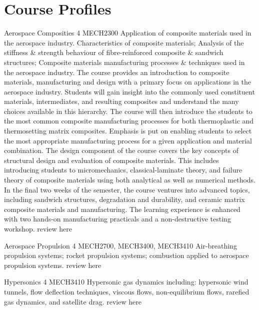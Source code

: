 \chapter{Course Profiles}



	{Aerospace Composities}
	{4}
	{MECH2300}
	{}
	{}
	{Application of composite materials used in the aerospace industry. Characteristics of composite materials; Analysis of the stiffness & strength behaviour of fibre-reinforced composite & sandwich structures; Composite materials manufacturing processes & techniques used in the aerospace industry. The course provides an introduction to composite materials, manufacturing and design with a primary focus on applications in the aerospace industry. Students will gain insight into the commonly used constituent materials, intermediates, and resulting composites and understand the many choices available in this hierarchy. The course will then introduce the students to the most common composite manufacturing processes for both thermoplastic and thermosetting matrix composites. Emphasis is put on enabling students to select the most appropriate manufacturing process for a given application and material combination. The design component of the course covers the key concepts of structural design and evaluation of composite materials. This includes introducing students to micromechanics, classical-laminate theory, and failure theory of composite materials using both analytical as well as numerical methods. In the final two weeks of the semester, the course ventures into advanced topics, including sandwich structures, degradation and durability, and ceramic matrix composite materials and manufacturing. The learning experience is enhanced with two hands-on manufacturing practicals and a non-destructive testing workshop.}
	{review here}

	{Aerospace Propulsion}
	{4}
	{MECH2700, MECH3400, MECH3410}
	{}
	{}
	{Air-breathing propulsion systems; rocket propulsion systems; combustion applied to aerospace propulsion systems.}
	{review here}

	{Hypersonics}
	{4}
	{MECH3410}
	{}
	{}
	{Hypersonic gas dynamics including:  hypersonic wind tunnels, flow deflection techniques, viscous flows, non-equilibrium flows, rarefied gas dynamics, and satellite drag.}
	{review here}

